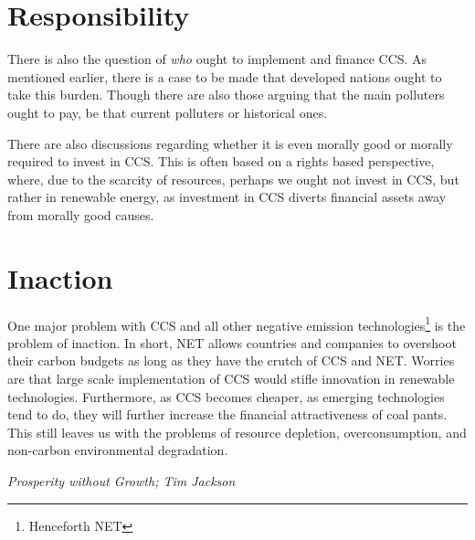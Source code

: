 \documentclass[12pt]{report}
\begin{document}
\section{Responsibility}

There is also the question of \emph{who} ought to implement and finance CCS. As
mentioned earlier, there is a case to be made that developed nations ought to
take this burden. Though there are also those arguing that the main polluters
ought to pay, be that current polluters or historical ones.

There are also discussions regarding whether it is even morally good or morally
required to invest in CCS. This is often based on a rights based perspective,
where, due to the scarcity of resources, perhaps we ought not invest in CCS, but
rather in renewable energy, as investment in CCS diverts financial assets away
from morally good causes.

\section{Inaction}

One major problem with CCS and all other negative emission
technologies\footnote{Henceforth NET} is the problem of inaction. In short, NET
allows countries and companies to overshoot their carbon budgets as long as they
have the crutch of CCS and NET. Worries are that large scale implementation of
CCS would stifle innovation in renewable technologies. Furthermore, as CCS
becomes cheaper, as emerging technologies tend to do, they will further increase
the financial attractiveness of coal pants. This still leaves us with the
problems of resource depletion, overconsumption, and non-carbon environmental
degradation.

\textit{Prosperity without Growth; Tim Jackson}
\end{document}

